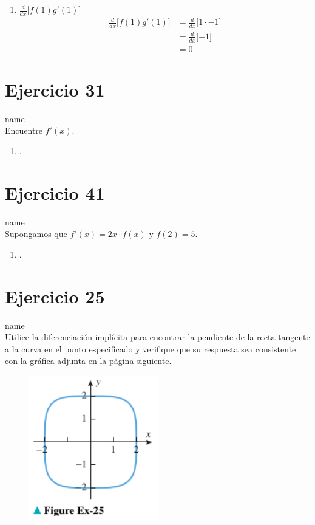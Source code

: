 \documentclass[12pt]{article}
\begin{document}
\begin{enumerate}[label=(\alph*)]
\item $\frac{d}{dx} \lbrack f(1)g'(1) \rbrack$
  \begin{equation*}
    \begin{split}
      \frac{d}{dx} \lbrack f(1)g'(1) \rbrack
      & = \frac{d}{dx} \lbrack 1 \cdot -1 \rbrack \\
      & = \frac{d}{dx} \lbrack -1 \rbrack \\
      & = 0
    \end{split}
  \end{equation*}
  
\end{enumerate}

\section{Ejercicio 31} name \\

Encuentre $f'(x)$.
\begin{enumerate}[label=(\alph*)]
\item .
\end{enumerate}

\section{Ejercicio 41} name \\

Supongamos que $f'(x) = 2x \cdot f(x)$ y $f(2) = 5$.
\begin{enumerate}[label=(\alph*)]
\item .
\end{enumerate}

\section{Ejercicio 25} name \\

Utilice la diferenciación implícita para encontrar la pendiente de la recta tangente a la curva en el punto especificado y verifique que su respuesta sea consistente con la gráfica adjunta en la página siguiente.
\begin{figure}[h!]
\centering
\includegraphics[width=0.5\textwidth]{../img/img_Lista2/3_25.png}
\end{figure}
\end{document}
